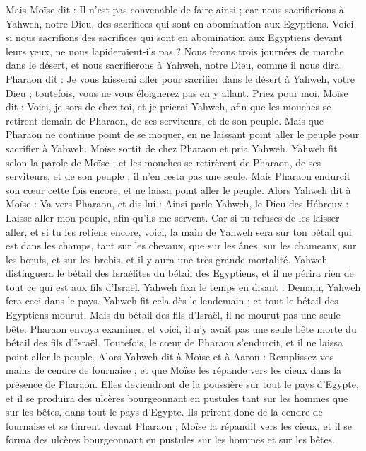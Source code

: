 \begin{multicols}{2}
Mais Moïse dit : Il n'est pas convenable de faire ainsi ; car nous sacrifierions à Yahweh, notre Dieu, des sacrifices qui sont en abomination aux Egyptiens. Voici, si nous sacrifions des sacrifices qui sont en abomination aux Egyptiens devant leurs yeux, ne nous lapideraient-ils pas ?
Nous ferons trois journées de marche dans le désert, et nous sacrifierons à Yahweh, notre Dieu, comme il nous dira.
Pharaon dit : Je vous laisserai aller pour sacrifier dans le désert à Yahweh, votre Dieu ; toutefois, vous ne vous éloignerez pas en y allant. Priez pour moi.
Moïse dit : Voici, je sors de chez toi, et je prierai Yahweh, afin que les mouches se retirent demain de Pharaon, de ses serviteurs, et de son peuple. Mais que Pharaon ne continue point de se moquer, en ne laissant point aller le peuple pour sacrifier à Yahweh.
Moïse sortit de chez Pharaon et pria Yahweh.
Yahweh fit selon la parole de Moïse ; et les mouches se retirèrent de Pharaon, de ses serviteurs, et de son peuple ; il n’en resta pas une seule.
Mais Pharaon endurcit son cœur cette fois encore, et ne laissa point aller le peuple.
\VerseOne{}Alors Yahweh dit à Moïse : Va vers Pharaon, et dis-lui : Ainsi parle Yahweh, le Dieu des Hébreux : Laisse aller mon peuple, afin qu'ils me servent.
Car si tu refuses de les laisser aller, et si tu les retiens encore,
voici, la main de Yahweh sera sur ton bétail qui est dans les champs, tant sur les chevaux, que sur les ânes, sur les chameaux, sur les bœufs, et sur les brebis, et il y aura une très grande mortalité.
Yahweh distinguera le bétail des Israélites du bétail des Egyptiens, et il ne périra rien de tout ce qui est aux fils d'Israël.
Yahweh fixa le temps en disant : Demain, Yahweh fera ceci dans le pays.
Yahweh fit cela dès le lendemain ; et tout le bétail des Egyptiens mourut. Mais du bétail des fils d'Israël, il ne mourut pas une seule bête.
Pharaon envoya examiner, et voici, il n'y avait pas une seule bête morte du bétail des fils d'Israël. Toutefois, le cœur de Pharaon s'endurcit, et il ne laissa point aller le peuple.
Alors Yahweh dit à Moïse et à Aaron : Remplissez vos mains de cendre de fournaise ; et que Moïse les répande vers les cieux dans la présence de Pharaon.
Elles deviendront de la poussière sur tout le pays d'Egypte, et il se produira des ulcères bourgeonnant en pustules tant sur les hommes que sur les bêtes, dans tout le pays d'Egypte.
Ils prirent donc de la cendre de fournaise et se tinrent devant Pharaon ; Moïse la répandit vers les cieux, et il se forma des ulcères bourgeonnant en pustules sur les hommes et sur les bêtes.

\end{multicols}
